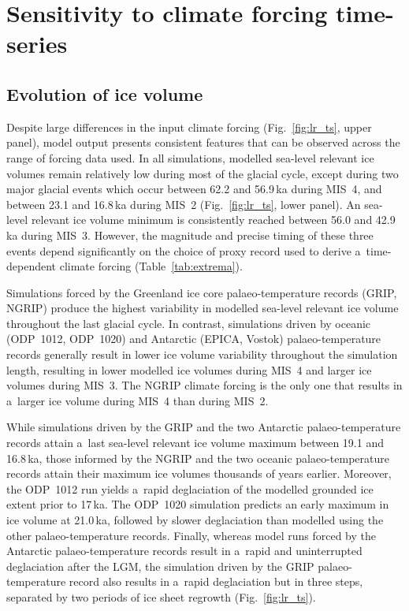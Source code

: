 \documentclass[tc, manuscript]{copernicus}
\begin{document}
\section{Sensitivity to climate forcing time-series}
\label{sec:results}

\subsection{Evolution of ice volume}

      Despite large differences in the input climate forcing
      (Fig.~\ref{fig:lr_ts}, upper panel), model output presents consistent
      features that can be observed across the range of forcing data used.
      In all simulations, modelled sea-level relevant ice volumes remain
      relatively low during
      most of the glacial cycle, except during two major glacial events
      which occur between 62.2 and 56.9\,\unit{ka} during MIS~4, and between
      23.1 and 16.8\,\unit{ka} during MIS~2 (Fig.~\ref{fig:lr_ts}, lower
      panel). An sea-level relevant ice volume minimum is consistently
      reached between 56.0 and
      42.9\,\unit{ka} during MIS~3. However, the magnitude and precise
      timing of these three events depend significantly on the choice of
      proxy record used to derive a~time-dependent climate forcing
      (Table~\ref{tab:extrema}).

      Simulations forced by the Greenland ice core palaeo-temperature
      records (GRIP, NGRIP) produce the highest variability in modelled
      sea-level relevant ice
      volume throughout the last glacial cycle. In contrast, simulations
      driven by oceanic (ODP~1012, ODP~1020) and Antarctic (EPICA, Vostok)
      palaeo-temperature records generally result in lower ice volume
      variability throughout the simulation length, resulting in lower
      modelled ice volumes during MIS~4 and larger ice volumes during MIS~3.
      The NGRIP climate forcing is the only one that results in a~larger ice
      volume during MIS~4 than during MIS~2.

      While simulations driven by the GRIP and the two Antarctic
      palaeo-temperature records attain a~last sea-level relevant ice volume
      maximum between
      19.1 and 16.8\,\unit{ka}, those informed by the NGRIP and the two
      oceanic palaeo-temperature records attain their maximum ice volumes
      thousands of years earlier. Moreover, the ODP~1012 run yields a~rapid
      deglaciation of the modelled grounded ice extent prior to
      17\,\unit{ka}. The ODP~1020
      simulation predicts an early maximum in ice volume at 21.0\,\unit{ka},
      followed by slower deglaciation than modelled using the other
      palaeo-temperature records. Finally, whereas model runs forced by the
      Antarctic palaeo-temperature records result in a~rapid and
      uninterrupted deglaciation after the LGM, the simulation driven by the
      GRIP palaeo-temperature record also results in a~rapid deglaciation
      but in three steps, separated by two periods of ice sheet regrowth
      (Fig.~\ref{fig:lr_ts}).
\end{document}
